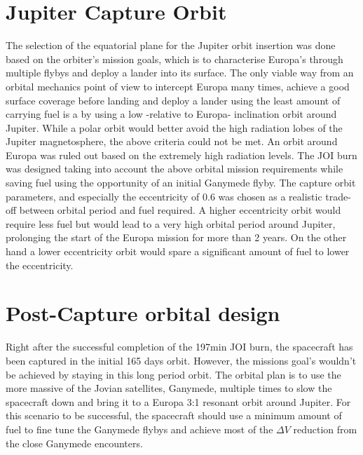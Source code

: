 \section{Jupiter Capture Orbit}
 The selection of the equatorial plane for the Jupiter orbit insertion was done based on the orbiter's mission goals, which is to characterise Europa’s through multiple flybys and deploy a lander into its surface. The only viable way from an orbital mechanics point of view to intercept Europa many times, achieve a good surface coverage before landing and deploy a lander using the least amount of carrying fuel is a by using a low -relative to Europa- inclination orbit around Jupiter. While a polar orbit would better avoid the high radiation lobes of the Jupiter magnetosphere, the above criteria could not be met. An orbit around Europa was ruled out based on the extremely high radiation levels. The JOI burn was designed taking into account the above orbital mission requirements while saving fuel using the opportunity of an initial Ganymede flyby. The capture orbit parameters, and especially the eccentricity of 0.6 was chosen as a realistic trade-off between orbital period and fuel required. A higher eccentricity orbit would require less fuel but would lead to a very high orbital period around Jupiter, prolonging the start of the Europa mission for more than 2 years. On the other hand a lower eccentricity orbit would spare a significant amount of fuel to lower the eccentricity.
\section{Post-Capture orbital design}
Right after the successful completion of the 197min JOI burn, the spacecraft has been captured in the initial 165 days orbit. However, the missions goal's wouldn't be achieved by staying in this long period orbit. The orbital plan is to use the more massive of the Jovian satellites, Ganymede, multiple times to slow the spacecraft down and bring it to a Europa 3:1 resonant orbit around Jupiter. For this scenario to be successful, the spacecraft should use a minimum amount of fuel to fine tune the Ganymede flybys and achieve most of the $\Delta V$ reduction from the close Ganymede encounters. 

